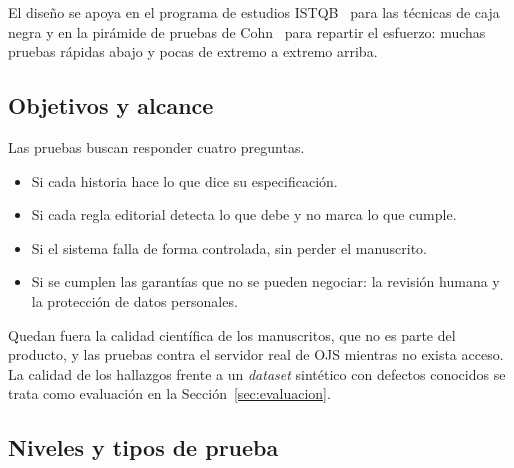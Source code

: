 El diseño se apoya en el programa de estudios ISTQB~\cite{ref33} para las técnicas de caja negra y en la pirámide de pruebas de Cohn~\cite{ref34} para repartir el esfuerzo: muchas pruebas rápidas abajo y pocas de extremo a extremo arriba.

\subsection{Objetivos y alcance}

Las pruebas buscan responder cuatro preguntas.

\begin{itemize}
  \item Si cada historia hace lo que dice su especificación.
  \item Si cada regla editorial detecta lo que debe y no marca lo que cumple.
  \item Si el sistema falla de forma controlada, sin perder el manuscrito.
  \item Si se cumplen las garantías que no se pueden negociar: la revisión humana y la protección de datos personales.
\end{itemize}

Quedan fuera la calidad científica de los manuscritos, que no es parte del producto, y las pruebas contra el servidor real de OJS mientras no exista acceso. La calidad de los hallazgos frente a un \emph{dataset} sintético con defectos conocidos se trata como evaluación en la Sección~\ref{sec:evaluacion}.

\subsection{Niveles y tipos de prueba}

